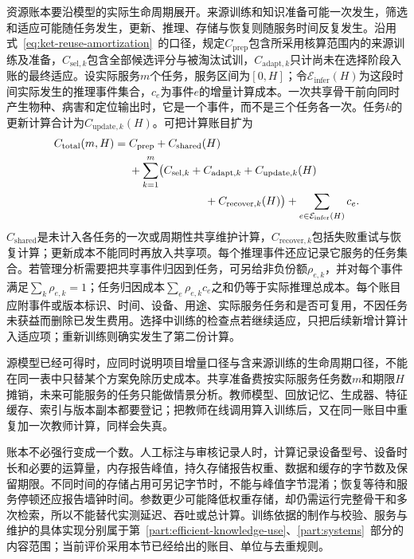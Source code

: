 资源账本要沿模型的实际生命周期展开。来源训练和知识准备可能一次发生，筛选和适应可能随任务发生，更新、推理、存储与恢复则随服务时间反复发生。沿用式~\eqref{eq:ket-reuse-amortization}~的口径，规定$C_{\mathrm{prep}}$包含所采用核算范围内的来源训练及准备，$C_{\mathrm{sel},k}$包含全部候选评分与被淘汰试训，$C_{\mathrm{adapt},k}$只计尚未在选择阶段入账的最终适应。设实际服务$m$个任务，服务区间为$[0,H]$；令$\mathcal E_{\mathrm{infer}}(H)$为这段时间实际发生的推理事件集合，$c_e$为事件$e$的增量计算成本。一次共享骨干前向同时产生物种、病害和定位输出时，它是一个事件，而不是三个任务各一次。任务$k$的更新计算合计为$C_{\mathrm{update},k}(H)$。可把计算账目扩为
\begin{equation}
  \begin{aligned}
    C_{\mathrm{total}}(m,H)
    ={}&C_{\mathrm{prep}}+C_{\mathrm{shared}}(H)\\
       &+\sum_{k=1}^{m}\bigl(
        C_{\mathrm{sel},k}+C_{\mathrm{adapt},k}
        +C_{\mathrm{update},k}(H)\\
       &\hspace{24mm}+C_{\mathrm{recover},k}(H)\bigr)
        +\sum_{e\in\mathcal E_{\mathrm{infer}}(H)}c_e.
  \end{aligned}
  \label{eq:ket-evaluation-ledger}
\end{equation}
$C_{\mathrm{shared}}$是未计入各任务的一次或周期性共享维护计算，$C_{\mathrm{recover},k}$包括失败重试与恢复计算；更新成本不能同时再放入共享项。每个推理事件还应记录它服务的任务集合。若管理分析需要把共享事件归因到任务，可另给非负份额$\rho_{e,k}$，并对每个事件满足$\sum_k\rho_{e,k}=1$；任务归因成本$\sum_e\rho_{e,k}c_e$之和仍等于实际推理总成本。每个账目应附事件或版本标识、时间、设备、用途、实际服务任务和是否可复用，不因任务未获益而删除已发生费用。选择中训练的检查点若继续适应，只把后续新增计算计入适应项；重新训练则确实发生了第二份计算。

源模型已经可得时，应同时说明项目增量口径与含来源训练的生命周期口径，不能在同一表中只替某个方案免除历史成本。共享准备费按实际服务任务数$m$和期限$H$摊销，未来可能服务的任务只能做情景分析。教师模型、回放记忆、生成器、特征缓存、索引与版本副本都要登记；把教师在线调用算入训练后，又在同一账目中重复加一次教师计算，同样会失真。

账本不必强行变成一个数。人工标注与审核记录人时，计算记录设备型号、设备时长和必要的运算量，内存报告峰值，持久存储报告权重、数据和缓存的字节数及保留期限。不同时间的存储占用可另记字节时，不能与峰值字节混淆；恢复等待和服务停顿还应报告墙钟时间。参数更少可能降低权重存储，却仍需运行完整骨干和多次检索，所以不能替代实测延迟、吞吐或总计算。训练依据的制作与校验、服务与维护的具体实现分别属于第~\ref{part:efficient-knowledge-use}、\ref{part:systems}~部分的内容范围；当前评价采用本节已经给出的账目、单位与去重规则。

